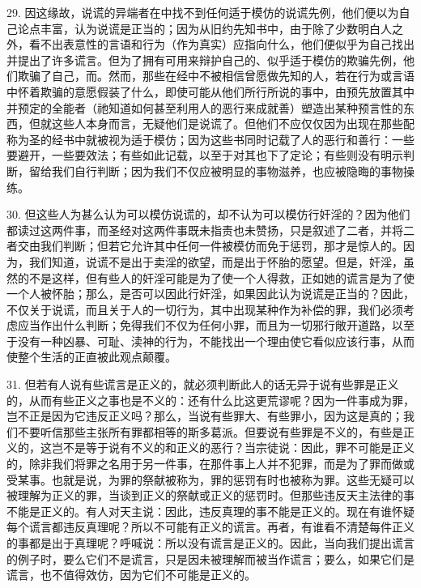 29. 因这缘故，说谎的异端者在中找不到任何适于模仿的说谎先例，他们便以为自己论点丰富，认为说谎是正当的；因为从旧约先知书中，由于除了少数明白人之外，看不出表意性的言语和行为（作为真实）应指向什么，他们便似乎为自己找出并提出了许多谎言。但为了拥有可用来辩护自己的、似乎适于模仿的欺骗先例，他们欺骗了自己，而。然而，那些在经中不被相信曾愿做先知的人，若在行为或言语中怀着欺骗的意愿假装了什么，即使可能从他们所行所说的事中，由预先放置其中并预定的全能者（祂知道如何甚至利用人的恶行来成就善）塑造出某种预言性的东西，但就这些人本身而言，无疑他们是说谎了。但他们不应仅仅因为出现在那些配称为圣的经书中就被视为适于模仿；因为这些书同时记载了人的恶行和善行：一些要避开，一些要效法；有些如此记载，以至于对其也下了定论；有些则没有明示判断，留给我们自行判断；因为我们不仅应被明显的事物滋养，也应被隐晦的事物操练。\par

30. 但这些人为甚么认为可以模仿说谎的，却不认为可以模仿行奸淫的？因为他们都读过这两件事，而圣经对这两件事既未指责也未赞扬，只是叙述了二者，并将二者交由我们判断；但若它允许其中任何一件被模仿而免于惩罚，那才是惊人的。因为，我们知道，说谎不是出于卖淫的欲望，而是出于怀胎的愿望。但是，奸淫，虽然的不是这样，但有些人的奸淫可能是为了使一个人得救，正如她的谎言是为了使一个人被怀胎；那么，是否可以因此行奸淫，如果因此认为说谎是正当的？因此，不仅关于说谎，而且关于人的一切行为，其中出现某种作为补偿的罪，我们必须考虑应当作出什么判断；免得我们不仅为任何小罪，而且为一切邪行敞开道路，以至于没有一种凶暴、可耻、渎神的行为，不能找出一个理由使它看似应该行事，从而使整个生活的正直被此观点颠覆。\par

31. 但若有人说有些谎言是正义的，就必须判断此人的话无异于说有些罪是正义的，从而有些正义之事也是不义的：还有什么比这更荒谬呢？因为一件事成为罪，岂不正是因为它违反正义吗？那么，当说有些罪大、有些罪小，因为这是真的；我们不要听信那些主张所有罪都相等的斯多葛派。但要说有些罪是不义的，有些是正义的，这岂不是等于说有不义的和正义的恶行？当宗徒说：因此，罪不可能是正义的，除非我们将罪之名用于另一件事，在那件事上人并不犯罪，而是为了罪而做或受某事。也就是说，为罪的祭献被称为，罪的惩罚有时也被称为罪。这些无疑可以被理解为正义的罪，当谈到正义的祭献或正义的惩罚时。但那些违反天主法律的事不能是正义的。有人对天主说：因此，违反真理的事不能是正义的。现在有谁怀疑每个谎言都违反真理呢？所以不可能有正义的谎言。再者，有谁看不清楚每件正义的事都是出于真理呢？呼喊说：所以没有谎言是正义的。因此，当向我们提出谎言的例子时，要么它们不是谎言，只是因未被理解而被当作谎言；要么，如果它们是谎言，也不值得效仿，因为它们不可能是正义的。\par

